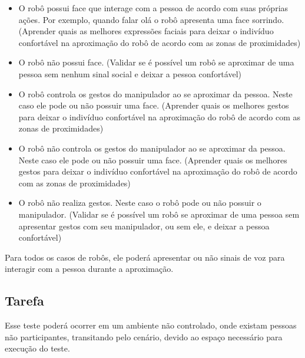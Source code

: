 \begin{itemize}
	\item O robô possui face que interage com a pessoa de acordo com suas próprias ações. Por exemplo, quando falar olá o robô apresenta uma face sorrindo. (Aprender quais as melhores expressões faciais para deixar o indivíduo confortável na aproximação do robô de acordo com as zonas de proximidades)
	\item O robô não possui face. (Validar se é possível um robô se aproximar de uma pessoa sem nenhum sinal social e deixar a pessoa confortável)
	\item O robô controla os gestos do manipulador ao se aproximar da pessoa. Neste caso ele pode ou não possuir uma face. (Aprender quais os melhores gestos para deixar o indivíduo confortável na aproximação do robô de acordo com as zonas de proximidades)
	\item O robô não controla os gestos do manipulador ao se aproximar da pessoa. Neste caso ele pode ou não possuir uma face. (Aprender quais os melhores gestos para deixar o indivíduo confortável na aproximação do robô de acordo com as zonas de proximidades)
	\item O robô não realiza gestos. Neste caso o robô pode ou não possuir o manipulador. (Validar se é possível um robô se aproximar de uma pessoa sem apresentar gestos com seu manipulador, ou sem ele, e deixar a pessoa confortável)
\end{itemize}

Para todos os casos de robôs, ele poderá apresentar ou não sinais de voz para interagir com a pessoa durante a aproximação.

\subsection{Tarefa}

Esse teste poderá ocorrer em um ambiente não controlado, onde existam pessoas não participantes, transitando pelo cenário, devido ao espaço necessário para execução do teste.

